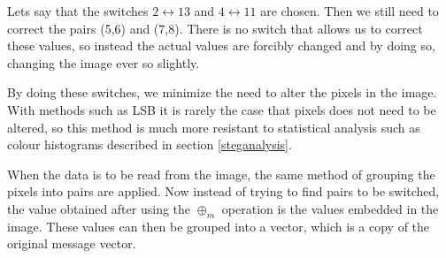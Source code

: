 Lets say that the switches $2\leftrightarrow 13$ and $4\leftrightarrow 11$ are chosen. Then we still need to correct the pairs (5,6) and (7,8). There is no switch that allows us to correct these values, so instead the actual values are forcibly changed and by doing so, changing the image ever so slightly.

By doing these switches, we minimize the need to alter the pixels in the image. With methods such as LSB it is rarely the case that pixels does not need to be altered, so this method is much more resistant to statistical analysis such as colour histograms described in section \ref{steganalysis}.

When the data is to be read from the image, the same method of grouping the pixels into pairs are applied. Now instead of trying to find pairs to be switched, the value obtained after using the $\oplus_m$ operation is the values embedded in the image. These values can then be grouped into a vector, which is a copy of the original message vector.